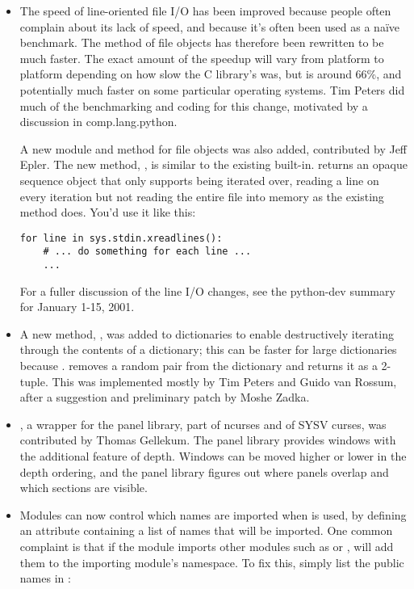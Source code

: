 \documentclass{howto}
\begin{document}
\begin{itemize}


\item The speed of line-oriented file I/O has been improved because
people often complain about its lack of speed, and because it's often
been used as a na\"ive benchmark.  The  method of
file objects has therefore been rewritten to be much faster.  The
exact amount of the speedup will vary from platform to platform
depending on how slow the C library's  was, but is
around 66\%, and potentially much faster on some particular operating
systems.  Tim Peters did much of the benchmarking and coding for this
change, motivated by a discussion in comp.lang.python.

A new module and method for file objects was also added, contributed
by Jeff Epler. The new method, , is similar to
the existing  built-in.  
returns an opaque sequence object that only supports being iterated
over, reading a line on every iteration but not reading the entire
file into memory as the existing  method does.
You'd use it like this:

\begin{verbatim}
for line in sys.stdin.xreadlines():
    # ... do something for each line ...
    ...
\end{verbatim}

For a fuller discussion of the line I/O changes, see the python-dev
summary for January 1-15, 2001.  

\item A new method, , was added to dictionaries to enable 
destructively iterating through the contents of a dictionary; this can be faster for large dictionaries because .  
 removes a random  pair
from the dictionary and returns it as a 2-tuple.  This was implemented
mostly by Tim Peters and Guido van Rossum, after a suggestion and
preliminary patch by Moshe Zadka.
 
\item {}, a wrapper for the panel library, part of
ncurses and of SYSV curses, was contributed by Thomas Gellekum.  The
panel library provides windows with the additional feature of depth.
Windows can be moved higher or lower in the depth ordering, and the
panel library figures out where panels overlap and which sections are
visible.

\item Modules can now control which names are imported when  is used, by defining an  attribute
containing a list of names that will be imported.  One common
complaint is that if the module imports other modules such as
 or , 
will add them to the importing module's namespace.  To fix this,
simply list the public names in :


\end{itemize}
\end{document}
